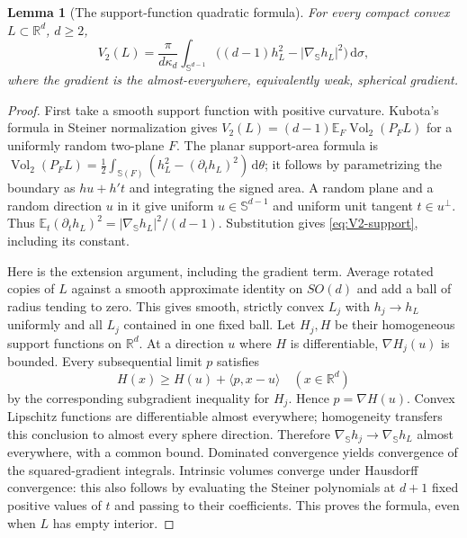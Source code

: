 \documentclass[10pt,reqno]{amsart}
\newtheorem{lemma}[theorem]{Lemma}
\theoremstyle{definition}
\theoremstyle{remark}
\newcommand{\R}{\mathbb R}
\newcommand{\E}{\mathbb E}
\newcommand{\Sphere}{\mathbb S}
\newcommand{\Vol}{\operatorname{Vol}}
\newcommand{\dd}{\,\mathrm d}
\newcommand{\ip}[2]{\langle #1,#2\rangle}
\begin{document}
\begin{lemma}[The support-function quadratic formula]\label{lem:V2-support}
For every compact convex $L\subset\R^d$, $d\ge2$,
\begin{equation}\label{eq:V2-support}
V_2(L)=\frac{\pi}{d\kappa_d}\int_{\Sphere^{d-1}}
\bigl((d-1)h_L^2-|\nabla_{\Sphere}h_L|^2\bigr)\dd\sigma,
\end{equation}
where the gradient is the almost-everywhere, equivalently weak, spherical gradient.
\end{lemma}
\begin{proof}
First take a smooth support function with positive curvature. Kubota's formula in Steiner normalization \cite{Schneider} gives
$V_2(L)=(d-1)\E_F\Vol_2(P_FL)$ for a uniformly random two-plane $F$.
The planar support-area formula is
$\Vol_2(P_FL)=\frac12\int_{\Sphere(F)}(h_L^2-(\partial_t h_L)^2)\dd\theta$;
it follows by parametrizing the boundary as $hu+h't$ and integrating the signed area.
A random plane and a random direction $u$ in it give uniform $u\in\Sphere^{d-1}$ and uniform unit tangent $t\in u^\perp$.
Thus $\E_t(\partial_t h_L)^2=|\nabla_{\Sphere}h_L|^2/(d-1)$.
Substitution gives \eqref{eq:V2-support}, including its constant.

Here is the extension argument, including the gradient term. Average rotated copies of $L$ against a smooth approximate identity on $SO(d)$ and add a ball of radius tending to zero. This gives smooth, strictly convex $L_j$ with $h_j\to h_L$ uniformly and all $L_j$ contained in one fixed ball. Let $H_j,H$ be their homogeneous support functions on $\R^d$. At a direction $u$ where $H$ is differentiable, $\nabla H_j(u)$ is bounded. Every subsequential limit $p$ satisfies
\[
H(x)\ge H(u)+\ip{p}{x-u}\quad(x\in\R^d)
\]
by the corresponding subgradient inequality for $H_j$. Hence $p=\nabla H(u)$.
Convex Lipschitz functions are differentiable almost everywhere; homogeneity transfers this conclusion to almost every sphere direction. Therefore $\nabla_{\Sphere}h_j\to\nabla_{\Sphere}h_L$ almost everywhere, with a common bound. Dominated convergence yields convergence of the squared-gradient integrals. Intrinsic volumes converge under Hausdorff convergence: this also follows by evaluating the Steiner polynomials at $d+1$ fixed positive values of $t$ and passing to their coefficients. This proves the formula, even when $L$ has empty interior.
\end{proof}
\end{document}
